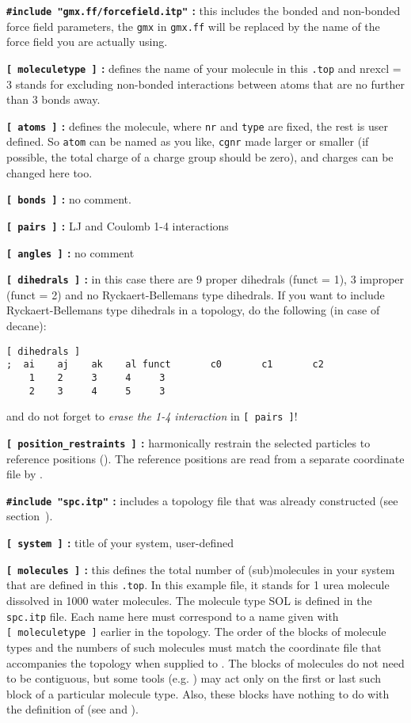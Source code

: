 {\bf {\tt \#include "gmx.ff/forcefield.itp"} :} this includes the bonded and
non-bonded force field parameters, the {\tt gmx} in {\tt gmx.ff} will be
replaced by the name of the force field you are actually using.

{\bf {\tt [~moleculetype~]} :} defines the name of your molecule in
this {\tt *.top} and nrexcl = 3 stands for excluding non-bonded
interactions between atoms that are no further than 3 bonds away.

{\bf {\tt [~atoms~]} :} defines the molecule, where {\tt nr} and
{\tt type} are fixed, the rest is user defined. So {\tt atom} can be named
as you like, {\tt cgnr} made larger or smaller (if possible, the total
charge of a charge group should be zero), and charges can be changed
here too.

{\bf {\tt [~bonds~]} :} no comment.

{\bf {\tt [~pairs~]} :} LJ and Coulomb 1-4 interactions

{\bf {\tt [~angles~]} :} no comment

{\bf {\tt [~dihedrals~]} :} in this case there are 9 proper dihedrals
(funct = 1), 3 improper (funct = 2) and no Ryckaert-Bellemans type
dihedrals. If you want to include Ryckaert-Bellemans type dihedrals
in a topology, do the following (in case of {\eg} decane):
\begin{verbatim}
[ dihedrals ]
;  ai    aj    ak    al funct       c0       c1       c2
    1    2     3     4     3 
    2    3     4     5     3
\end{verbatim}
and do not forget to {\em erase the 1-4 interaction} 
in {\tt [~pairs~]}!

{\bf {\tt [~position_restraints~]} :} harmonically restrain the selected particles
to reference positions (). 
The reference positions are read from a 
separate coordinate file by {\tt {}}.

{\bf {\tt \#include "spc.itp"} :} includes a topology file that was already
constructed (see section~).

{\bf {\tt [~system~]} :} title of your system, user-defined

{\bf {\tt [~molecules~]} :} this defines the total number of (sub)molecules
in your system that are defined in this {\tt *.top}. In this
example file, it stands for 1 urea molecule dissolved in 1000 water
molecules. The molecule type SOL is defined in the {\tt spc.itp} file.
Each name here must correspond to a name given with {\tt [~moleculetype~]}
earlier in the topology. The order of the blocks of molecule types and
the numbers of such molecules must match the coordinate file that
accompanies the topology when supplied to {\tt {}}.
The blocks of molecules do not need to be contiguous, but some
tools (e.g. {\tt {}}) may act only on the first or
last such block of a particular molecule type. Also, these blocks
have nothing to do with the definition of 
(see  and ).

